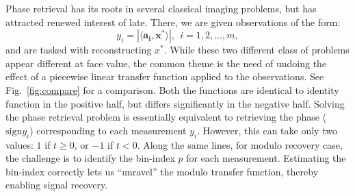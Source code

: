 Phase retrieval has its roots in several classical imaging problems, but has attracted renewed interest of late. There, we are given observations of the form:
\[
y_i= | \langle \mathbf{a_i} , \mathbf{x^*} \rangle|,~~i = 1, 2, \ldots, m,
\]
and are tasked with reconstructing $x^*$.  While these two different class of problems appear different at face value, the common theme is the need of undoing the effect of a piecewise linear transfer function applied to the observations. See Fig.~\ref{fig:compare} for a comparison.
Both the functions are identical to identity function in the positive half, but differs significantly in the negative half. Solving the phase retrieval problem is essentially equivalent to retrieving the phase ($\text{sign}{y_i}$) corresponding to each measurement $y_i$. However, this can take only two values: $1$ if $t \geq 0$, or $-1$ if $t < 0$. Along the same lines, for modulo recovery case, the challenge is to identify the bin-index $p$ for each measurement. %
Estimating the bin-index correctly lets us ``unravel'' the modulo transfer function, thereby enabling signal recovery.
